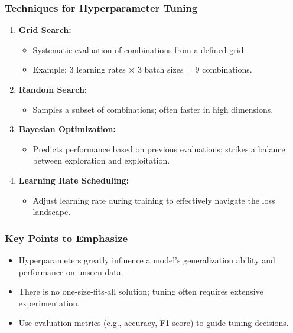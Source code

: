 \documentclass[aspectratio=169]{beamer}
\begin{document}
\begin{frame}
    \frametitle{Techniques for Hyperparameter Tuning}
    \begin{enumerate}
        \item \textbf{Grid Search:}
            \begin{itemize}
                \item Systematic evaluation of combinations from a defined grid.
                \item Example: 3 learning rates × 3 batch sizes = 9 combinations.
            \end{itemize}
        \item \textbf{Random Search:}
            \begin{itemize}
                \item Samples a subset of combinations; often faster in high dimensions.
            \end{itemize}
        \item \textbf{Bayesian Optimization:}
            \begin{itemize}
                \item Predicts performance based on previous evaluations; strikes a balance between exploration and exploitation.
            \end{itemize}
        \item \textbf{Learning Rate Scheduling:}
            \begin{itemize}
                \item Adjust learning rate during training to effectively navigate the loss landscape.
            \end{itemize}
    \end{enumerate}
\end{frame}

\begin{frame}
    \frametitle{Key Points to Emphasize}
    \begin{itemize}
        \item Hyperparameters greatly influence a model's generalization ability and performance on unseen data.
        \item There is no one-size-fits-all solution; tuning often requires extensive experimentation.
        \item Use evaluation metrics (e.g., accuracy, F1-score) to guide tuning decisions.
    \end{itemize}
\end{frame}
\end{document}
